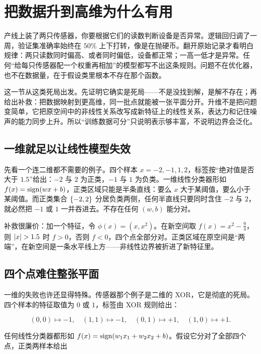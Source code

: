 \section{把数据升到高维为什么有用}
\label{sec:13-Machine-Learning/09-Kernel-Methods-and-Gaussian-Processes/01}

产线上装了两只传感器，你要根据它们的读数判断设备是否异常。逻辑回归调了一周，验证集准确率始终在 \(50\%\) 上下打转，像是在抛硬币。翻开原始记录才看明白规律：两只读数同时偏高、或者同时偏低，设备都正常；一高一低才是异常。任何``给每只传感器配一个权重再相加''的模型都写不出这条规则。问题不在优化器，也不在数据量，在于假设类里根本不存在那个函数。

这一节从这类死局出发。先证明它确实是死局——不是没找到解，是解不存在；再给出补救：把数据映射到更高维，同一批点就能被一张平面分开。升维不是把问题变简单，它把原空间中的非线性关系改写成新特征上的线性关系，表达力和记住噪声的能力同步上升。所以``训练数据可分''只说明表示够丰富，不说明边界会泛化。

\subsection{一维就足以让线性模型失效}

先看一个连二维都不需要的例子。四个样本 \(x=-2,-1,1,2\)，标签按``绝对值是否大于 \(1.5\)''给出：\(-2\) 与 \(2\) 为正类，\(-1\) 与 \(1\) 为负类。一维线性分类器形如 \(f(x)=\operatorname{sign}(wx+b)\)，正类区域只能是半条直线：要么 \(x\) 大于某阈值，要么小于某阈值。而正类集合 \(\left\{-2,2\right\}\) 分居负类两侧，任何半直线只要同时含住 \(-2\) 与 \(2\)，就必然把 \(-1\) 或 \(1\) 一并吞进去。不存在任何 \((w,b)\) 能分对。

补救很廉价：加一个特征，令 \(\phi(x)=(x,x^2)\)。在新空间取 \(f(x)=x^2-\tfrac94\)，则 \(\abs{x}>1.5\) 时 \(f>0\)，否则 \(f<0\)，四个点全部分对。正类区域在原空间是``两端''，在新空间是一条水平线上方——非线性边界被折进了新特征里。

\subsection{四个点难住整张平面}

一维的失败也许还显得特殊。传感器那个例子是二维的 XOR，它是彻底的死局。四个样本的特征取值为 \(0\) 或 \(1\)，标签由 XOR 规则给出：

\[
(0,0)\mapsto -1,\quad
(1,1)\mapsto -1,\quad
(0,1)\mapsto +1,\quad
(1,0)\mapsto +1.
\]

任何线性分类器都形如 \(f(x)=\operatorname{sign}(w_1x_1+w_2x_2+b)\)。假设它分对了全部四个点，正类两样本给出

